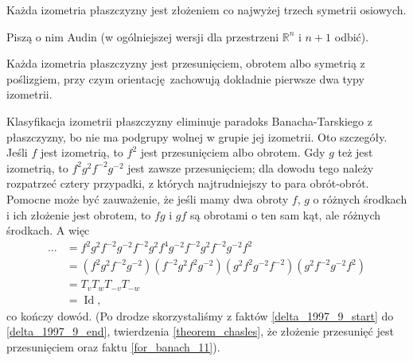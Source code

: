 
\begin{theorem}[Chasles'a]
%
\label{theorem_chasles}
    Każda izometria płaszczyzny jest złożeniem co najwyżej trzech symetrii osiowych.
\end{theorem}

Piszą o nim Audin \cite[s. 49]{audin_2003} (w ogólniejszej wersji dla przestrzeni $\mathbb R^n$ i $n+1$ odbić).

\begin{corollary}
    Każda izometria płaszczyzny jest przesunięciem, obrotem albo symetrią z poślizgiem, przy czym orientację zachowują dokładnie pierwsze dwa typy izometrii.
\end{corollary}

Klasyfikacja izometrii płaszczyzny eliminuje paradoks Banacha-Tarskiego z płaszczyzny, bo nie ma podgrupy wolnej w grupie jej izometrii.
Oto szczegóły.
Jeśli $f$ jest izometrią, to $f^2$ jest przesunięciem albo obrotem.
Gdy $g$ też jest izometrią, to $f^2g^2f^{-2}g^{-2}$ jest zawsze przesunięciem; dla dowodu tego należy rozpatrzeć cztery przypadki, z których najtrudniejszy to para obrót-obrót.
Pomocne może być zauważenie, że jeśli mamy dwa obroty $f$, $g$ o różnych środkach i ich złożenie jest obrotem, to $fg$ i $gf$ są obrotami o ten sam kąt, ale różnych środkach.
A więc 
\begin{align}
    \ldots & = f^2 g^2 f^{-2} g^{-2} f^{-2} g^2 f^4 g^{-2} f^{-2} g^2 f^{-2} g^{-2} f^2 \\
    & = (f^2 g^2 f^{-2} g^{-2})( f^{-2} g^2 f^2 g^{-2}) (g^2 f^2g^{-2} f^{-2} ) (g^2 f^{-2} g^{-2} f^2) \\
    & = T_v T_w T_{-v} T_{-w} \\
    & = \operatorname{Id},
\end{align}
co kończy dowód.
(Po drodze skorzystaliśmy z faktów \ref{delta_1997_9_start} do \ref{delta_1997_9_end}, twierdzenia \ref{theorem_chasles}, że złożenie przesunięć jest przesunięciem oraz faktu \ref{for_banach_11}).
